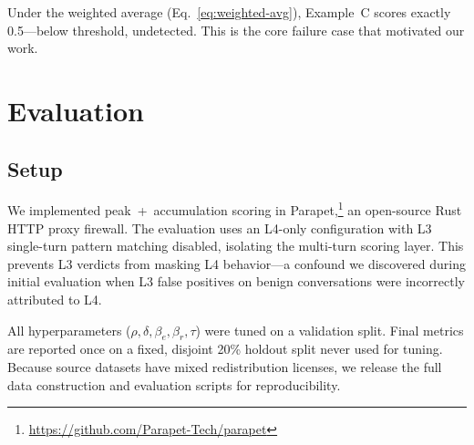 \documentclass[11pt,a4paper]{article}
\begin{document}
\noindent Under the weighted average (Eq.~\ref{eq:weighted-avg}),
Example~C scores exactly 0.5---below threshold, undetected. This is the
core failure case that motivated our work.

\section{Evaluation}
\label{sec:eval}

\subsection{Setup}

We implemented peak~+~accumulation scoring in
Parapet,\footnote{\url{https://github.com/Parapet-Tech/parapet}} an open-source Rust
HTTP proxy firewall. The evaluation uses an L4-only configuration with
L3 single-turn pattern matching disabled, isolating the multi-turn
scoring layer. This prevents L3 verdicts from masking L4 behavior---a
confound we discovered during initial evaluation when L3 false positives
on benign conversations were incorrectly attributed to L4.

All hyperparameters ($\rho, \delta, \beta_e, \beta_r, \tau$) were tuned
on a validation split. Final metrics are reported once on a fixed,
disjoint 20\% holdout split never used for tuning. Because source
datasets have mixed redistribution licenses, we release the full data
construction and evaluation scripts for reproducibility.
\end{document}
